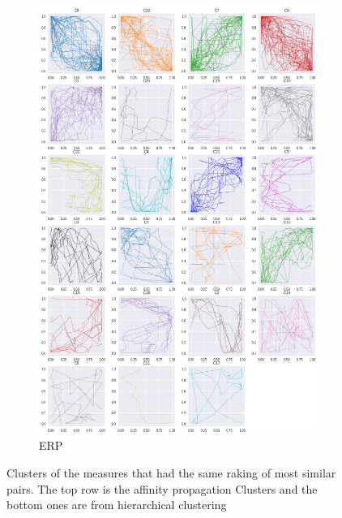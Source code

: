\begin{figure}[h]
\begin{subfigure}[c]{0.3\linewidth}
     \includegraphics[width=\linewidth]{figs/clusters/CLU_H_ALL[ERP;g=0,0].png}
    \caption{ERP}
  \end{subfigure}
  \caption{Clusters of the measures that had the same raking of most similar pairs. The top row is the affinity propagation Clusters and the bottom ones are from hierarchical clustering}
  \label{fig:cluster-ed-erp-msm}
\end{figure}



